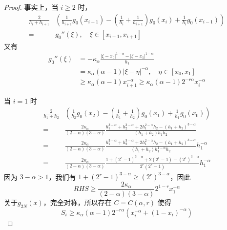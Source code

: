 \documentclass{ctexart}
\theoremstyle{definition}
\theoremstyle{remark}
\numberwithin{equation}{section}
\begin{document}
\begin{proof}
    事实上，当 \(i\ge 2\) 时，
    \begin{equation}
        \begin{aligned}
            \frac{2}{h_i + h_{i+1}} & \left( \frac{1}{h_{i+1}} g_0(x_{i+1}) - (\frac{1}{h_{i}}+\frac{1}{h_{i+1}})g_0(x_{i}) + \frac{1}{h_{i}} g_0(x_{i-1}) \right) \\
            =                       & g_0''(\xi), \quad \xi \in [x_{i-1}, x_{i+1}]
        \end{aligned}
    \end{equation}
    又有
    \begin{equation}
        \begin{aligned}
            g_0''(\xi) & =  -\kappa_\alpha \frac{|\xi-x_0|^{1-\alpha} - |\xi-x_1|^{1-\alpha}}{h_1}                        \\
                       & = \kappa_\alpha(\alpha-1)|\xi-\eta|^{-\alpha} , \quad \eta\in [x_0, x_1]                       \\
                       & \ge \kappa_\alpha(\alpha-1) x_{i+1}^{-\alpha}  \ge \kappa_\alpha(\alpha-1) 2^{-r\alpha} x_{i}^{-\alpha}
        \end{aligned}
    \end{equation}

    当 \(i=1\) 时
    \begin{equation}
        \begin{aligned}
            \frac{2}{h_{1} + h_{2}} & \left( \frac{1}{h_{2}} g_0(x_{2}) - (\frac{1}{h_{1}}+\frac{1}{h_{2}})g_0(x_{1}) + \frac{1}{h_{1}} g_0(x_{0}) \right)                                                  \\
            =                       & \frac{2\kappa_\alpha}{(2-\alpha)(3-\alpha)} \frac{h_1^{3-\alpha}+h_2^{3-\alpha} + 2h_1^{2-\alpha}h_2 - (h_1+h_2)^{3-\alpha} }{(h_{1} + h_{2})h_1 h_2}                          \\
            =                       & \frac{2\kappa_\alpha}{(2-\alpha)(3-\alpha)} \frac{h_1^{3-\alpha}+h_2^{3-\alpha} + 2h_1^{2-\alpha}h_2 - (h_1+h_2)^{3-\alpha} }{(h_{1} + h_{2})h_1^{1-\alpha} h_2} h_1^{-\alpha} \\
            =                       & \frac{2\kappa_\alpha}{(2-\alpha)(3-\alpha)} \frac{1+(2^r-1)^{3-\alpha} + 2(2^r-1) - (2^r)^{3-\alpha} }{2^r (2^r-1)} h_1^{-\alpha}
        \end{aligned}
    \end{equation}
    因为 \(3-\alpha > 1\)，我们有 \(1+(2^r-1)^{3-\alpha} \ge (2^r)^{3-\alpha}\)，因此
    \begin{equation}
        RHS \ge \frac{2\kappa_\alpha}{(2-\alpha)(3-\alpha)} 2^{1-r} x_1^{-\alpha}
    \end{equation}
    关于\(g_{2N}(x)\)，完全对称，所以存在 \(C=C(\alpha,r)\) 使得
    \begin{equation}
        S_i \ge \kappa_\alpha(\alpha-1) 2^{-r\alpha} (x_i^{-\alpha} + (1-x_i)^{-\alpha})
    \end{equation}
\end{proof}
\end{document}
